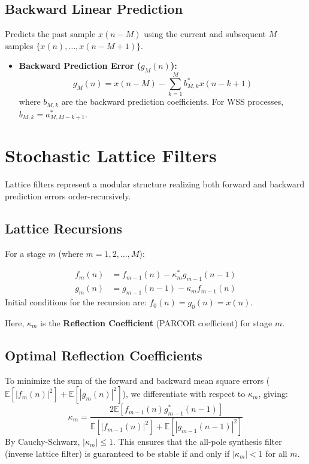 \documentclass[12pt,a4paper]{article}
\begin{document}
\subsection{Backward Linear Prediction}
Predicts the past sample $x(n-M)$ using the current and subsequent $M$ samples $\{x(n), \dots, x(n-M+1)\}$.
\begin{itemize}[leftmargin=*, itemsep=2pt]
  \item \textbf{Backward Prediction Error ($g_M(n)$):}
  \begin{equation}
    g_M(n) = x(n-M) - \sum_{k=1}^M b_{M,k}^* x(n-k+1)
  \end{equation}
  where $b_{M,k}$ are the backward prediction coefficients. For WSS processes, $b_{M,k} = a_{M, M-k+1}^*$.
\end{itemize}

\section{Stochastic Lattice Filters}

Lattice filters represent a modular structure realizing both forward and backward prediction errors order-recursively.

\subsection{Lattice Recursions}
For a stage $m$ (where $m=1, 2, \dots, M$):
\begin{tcolorbox}[defbox, title={Lattice Prediction Error Updates}]
\begin{align}
  f_m(n) &= f_{m-1}(n) - \kappa_m^* g_{m-1}(n-1) \\
  g_m(n) &= g_{m-1}(n-1) - \kappa_m f_{m-1}(n)
\end{align}
Initial conditions for the recursion are: $f_0(n) = g_0(n) = x(n)$.
\end{tcolorbox}
Here, $\kappa_m$ is the \textbf{Reflection Coefficient} (PARCOR coefficient) for stage $m$.

\subsection{Optimal Reflection Coefficients}
To minimize the sum of the forward and backward mean square errors ($\mathbb{E}[|f_m(n)|^2] + \mathbb{E}[|g_m(n)|^2]$), we differentiate with respect to $\kappa_m$, giving:
\begin{equation}
  \kappa_m = \frac{2\mathbb{E}[f_{m-1}(n) g_{m-1}^*(n-1)]}{\mathbb{E}[|f_{m-1}(n)|^2] + \mathbb{E}[|g_{m-1}(n-1)|^2]}
\end{equation}
By Cauchy-Schwarz, $|\kappa_m| \le 1$. This ensures that the all-pole synthesis filter (inverse lattice filter) is guaranteed to be stable if and only if $|\kappa_m| < 1$ for all $m$.
\end{document}
